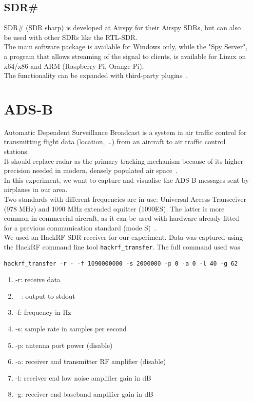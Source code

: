 \documentclass[conference]{IEEEtran}
\begin{document}
\subsection{SDR\#}
SDR\# (SDR sharp) is developed at Airspy for their Airspy SDRs, but can also be used with other SDRs like the RTL-SDR.\\The main software package is available for Windows only, while the "Spy Server", a program that allows streaming of the signal to clients, is available for Linux on x64/x86 and ARM (Raspberry Pi, Orange Pi).\\
The functionality can be expanded with third-party plugins~\cite{SDRsharp19Download}.

\section{ADS-B}
Automatic Dependent Surveillance Broadcast is a system in air traffic control for transmitting flight data (location, \ldots) from an aircraft to air traffic control stations.\\
It should replace radar as the primary tracking mechanism because of its higher precision needed in modern, densely populated air space~\cite{strohmeier2014realities}.\\
In this experiment, we want to capture and visualise the ADS-B messages sent by airplanes in our area.\\
Two standards with different frequencies are in use: Universal Access Transceiver (978 MHz) and 1090 MHz extended squitter (1090ES). The latter is more common in commercial aircraft, as it can be used with hardware already fitted for a previous communication standard (mode S)~\cite{strohmeier2014realities}.\\
We used an HackRF SDR receiver for our experiment. Data was captured using the HackRF command line tool \lstinline|hackrf_transfer|. The full command used was
\begin{lstlisting}
hackrf_transfer -r - -f 1090000000 -s 2000000 -p 0 -a 0 -l 40 -g 62
\end{lstlisting}
\begin{enumerate}
	\item -r: receive data
	\item ~-: output to stdout
	\item -f: frequency in Hz
	\item -s: sample rate in samples per second
	\item -p: antenna port power (disable)
	\item -a: receiver and transmitter RF amplifier (disable)
	\item -l: receiver end low noise amplifier gain in dB
	\item -g: receiver end baseband amplifier gain in dB
\end{enumerate}
\end{document}
